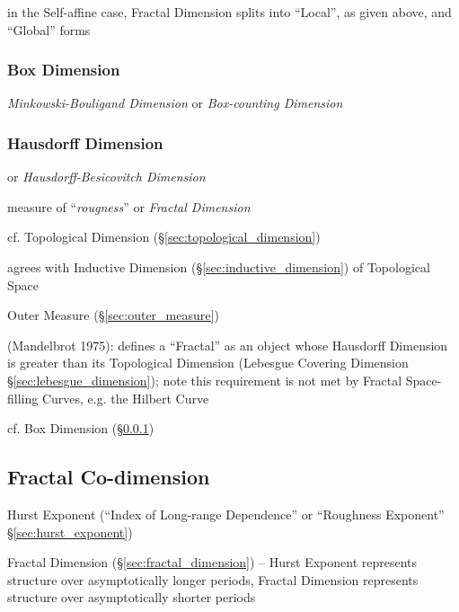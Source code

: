 in the Self-affine case, Fractal Dimension splits into ``Local'', as given
above, and ``Global'' forms



\subsubsection{Box Dimension}\label{sec:box_dimension}

\emph{Minkowski-Bouligand Dimension} or \emph{Box-counting Dimension}



\subsubsection{Hausdorff Dimension}\label{sec:hausdorff_dimension}

or \emph{Hausdorff-Besicovitch Dimension}

measure of ``\emph{rougness}'' or \emph{Fractal Dimension}

cf. Topological Dimension (\S\ref{sec:topological_dimension})

agrees with Inductive Dimension (\S\ref{sec:inductive_dimension}) of Topological
Space

Outer Measure (\S\ref{sec:outer_measure})

(Mandelbrot 1975): defines a ``Fractal'' as an object whose Hausdorff Dimension
is greater than its Topological Dimension (Lebesgue Covering Dimension
\S\ref{sec:lebesgue_dimension}); note this requirement is not met by Fractal
Space-filling Curves, e.g. the Hilbert Curve

cf. Box Dimension (\S\ref{sec:box_dimension})



\subsection{Fractal Co-dimension}\label{sec:fractal_codimension}

Hurst Exponent (``Index of Long-range Dependence'' or ``Roughness Exponent''
\S\ref{sec:hurst_exponent})

Fractal Dimension (\S\ref{sec:fractal_dimension}) -- Hurst Exponent represents
structure over asymptotically longer periods, Fractal Dimension represents
structure over asymptotically shorter periods


